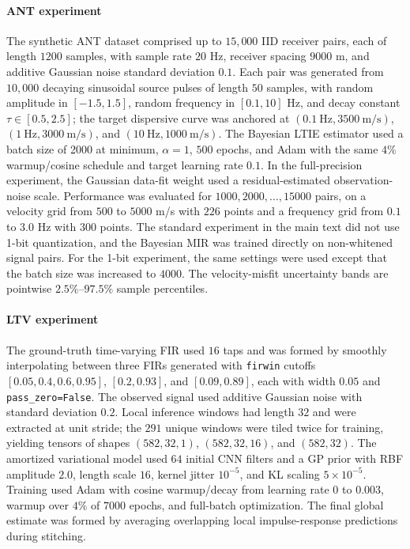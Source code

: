 \documentclass[preprint,1p,times,authoryear]{elsarticle}
\begin{document}
\paragraph{\textbf{ANT experiment}}
The synthetic ANT dataset comprised up to $15{,}000$ IID receiver pairs, each of length $1200$ samples, with sample rate $20$ Hz, receiver spacing $9000$ m, and additive Gaussian noise standard deviation $0.1$. Each pair was generated from $10{,}000$ decaying sinusoidal source pulses of length $50$ samples, with random amplitude in $[-1.5,1.5]$, random frequency in $[0.1,10]$ Hz, and decay constant $\tau \in [0.5,2.5]$; the target dispersive curve was anchored at $(0.1~\text{Hz},3500~\text{m/s})$, $(1~\text{Hz},3000~\text{m/s})$, and $(10~\text{Hz},1000~\text{m/s})$. The Bayesian LTIE estimator used a batch size of 2000 at minimum, $\alpha=1$, $500$ epochs, and Adam with the same $4\%$ warmup/cosine schedule and target learning rate $0.1$. In the full-precision experiment, the Gaussian data-fit weight used a residual-estimated observation-noise scale. Performance was evaluated for $1000,2000,\ldots,15000$ pairs, on a velocity grid from $500$ to $5000$ m/s with $226$ points and a frequency grid from $0.1$ to $3.0$ Hz with $300$ points. The standard experiment in the main text did not use 1-bit quantization, and the Bayesian MIR was trained directly on non-whitened signal pairs. For the 1-bit experiment, the same settings were used except that the batch size was increased to $4000$. The velocity-misfit uncertainty bands are pointwise $2.5\%$--$97.5\%$ sample percentiles.

\paragraph{\textbf{LTV experiment}}
The ground-truth time-varying FIR used $16$ taps and was formed by smoothly interpolating between three FIRs generated with \texttt{firwin} cutoffs $[0.05,0.4,0.6,0.95]$, $[0.2,0.93]$, and $[0.09,0.89]$, each with width $0.05$ and \texttt{pass\_zero=False}. The observed signal used additive Gaussian noise with standard deviation $0.2$. Local inference windows had length $32$ and were extracted at unit stride; the $291$ unique windows were tiled twice for training, yielding tensors of shapes $(582,32,1)$, $(582,32,16)$, and $(582,32)$. The amortized variational model used $64$ initial CNN filters and a GP prior with RBF amplitude $2.0$, length scale $16$, kernel jitter $10^{-5}$, and KL scaling $5 \times 10^{-5}$. Training used Adam with cosine warmup/decay from learning rate $0$ to $0.003$, warmup over $4\%$ of $7000$ epochs, and full-batch optimization. The final global estimate was formed by averaging overlapping local impulse-response predictions during stitching.
\end{document}
